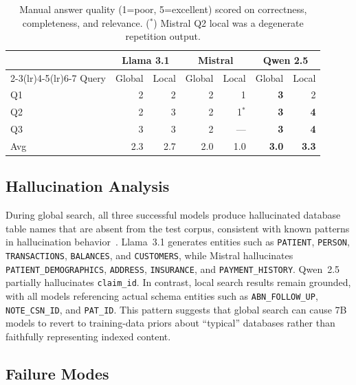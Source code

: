 \documentclass{article}
\begin{document}
\begin{table}[h]
  \caption{Manual answer quality (1=poor, 5=excellent) scored on correctness, completeness, and relevance. (${}^{*}$) Mistral Q2 local was a degenerate repetition output.}
  \label{tab:quality}
  \centering
  \small
  \begin{tabular}{lrrrrrr}
    \toprule
    & \multicolumn{2}{c}{Llama 3.1} & \multicolumn{2}{c}{Mistral} & \multicolumn{2}{c}{Qwen 2.5} \\
    \cmidrule(lr){2-3}\cmidrule(lr){4-5}\cmidrule(lr){6-7}
    Query & Global & Local & Global & Local      & Global       & Local        \\
    \midrule
    Q1    & 2      & 2     & 2      & 1          & \textbf{3}   & 2            \\
    Q2    & 2      & 3     & 2      & 1$^{*}$    & \textbf{3}   & \textbf{4}   \\
    Q3    & 3      & 3     & 2      & ---        & \textbf{3}   & \textbf{4}   \\
    \midrule
    Avg   & 2.3    & 2.7   & 2.0    & 1.0        & \textbf{3.0} & \textbf{3.3} \\
    \bottomrule
  \end{tabular}
\end{table}

\subsection{Hallucination Analysis}

During global search, all three successful models produce hallucinated database table names that are absent from the test corpus, consistent with known patterns in hallucination behavior~\cite{ji2023survey}. Llama~3.1 generates entities such as \texttt{PATIENT}, \texttt{PERSON}, \texttt{TRANSACTIONS}, \texttt{BALANCES}, and \texttt{CUSTOMERS}, while Mistral hallucinates \texttt{PATIENT\_DEMOGRAPHICS}, \texttt{ADDRESS}, \texttt{INSURANCE}, and \texttt{PAYMENT\_HISTORY}. Qwen~2.5 partially hallucinates \texttt{claim\_id}. In contrast, local search results remain grounded, with all models referencing actual schema entities such as \texttt{ABN\_FOLLOW\_UP}, \texttt{NOTE\_CSN\_ID}, and \texttt{PAT\_ID}. This pattern suggests that global search can cause 7B models to revert to training-data priors about ``typical'' databases rather than faithfully representing indexed content.

\subsection{Failure Modes}
\label{sec:failure}
\end{document}
